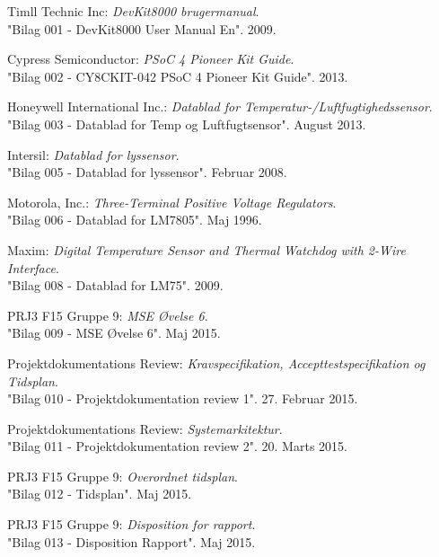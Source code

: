 	\fancyhead[CE,CO]{}
\renewcommand{\bibname}{Litteraturliste}
\begin{thebibliography}{2}

 Timll Technic Inc: \textit{DevKit8000 brugermanual}. \\ 
"Bilag 001 - DevKit8000 User Manual En". 2009.

 Cypress Semiconductor: \textit{PSoC 4 Pioneer Kit Guide}. \\
"Bilag 002 - CY8CKIT-042 PSoC 4 Pioneer Kit Guide". 2013.

 Honeywell International Inc.: \textit{Datablad for Temperatur-/Luftfugtighedssensor}. \\
"Bilag 003 - Datablad for Temp og Luftfugtsensor". August 2013.

 Intersil: \textit{Datablad for lyssensor}. \\
"Bilag 005 - Datablad for lyssensor". Februar 2008. 

 Motorola, Inc.: \textit{Three-Terminal Positive Voltage Regulators}. \\
"Bilag 006 - Datablad for LM7805". Maj 1996.

 Maxim: \textit{Digital Temperature Sensor and Thermal Watchdog with 2-Wire Interface}. \\
 "Bilag 008 - Datablad for LM75". 2009.

 PRJ3 F15 Gruppe 9: \textit{MSE Øvelse 6}. \\
"Bilag 009 - MSE Øvelse 6". Maj 2015. 

 Projektdokumentations Review: \textit{Kravspecifikation, Accepttestspecifikation og Tidsplan}.\\
"Bilag 010 - Projektdokumentation review 1". 27. Februar 2015.

 Projektdokumentations Review: \textit{Systemarkitektur}. \\
"Bilag 011 - Projektdokumentation review 2". 20. Marts 2015.

 PRJ3 F15 Gruppe 9: \textit{Overordnet tidsplan}. \\
"Bilag 012 - Tidsplan". Maj 2015.

 PRJ3 F15 Gruppe 9: \textit{Disposition for rapport}. \\
"Bilag 013 - Disposition Rapport". Maj 2015.  


\end{thebibliography}
